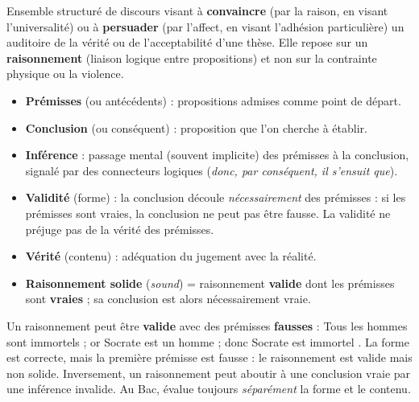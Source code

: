 \documentclass[11pt]{article}
\begin{document}
\begin{definition}[Argumentation]
Ensemble structuré de discours visant à \textbf{convaincre} (par la raison, en visant l'universalité) ou à \textbf{persuader} (par l'affect, en visant l'adhésion particulière) un auditoire de la vérité ou de l'acceptabilité d'une thèse. Elle repose sur un \textbf{raisonnement} (liaison logique entre propositions) et non sur la contrainte physique ou la violence.
\end{definition}

\begin{definition}
\begin{itemize}
  \item \textbf{Prémisses} (ou antécédents) : propositions admises comme point de départ.
  \item \textbf{Conclusion} (ou conséquent) : proposition que l'on cherche à établir.
  \item \textbf{Inférence} : passage mental (souvent implicite) des prémisses à la conclusion, signalé par des connecteurs logiques (\emph{donc, par conséquent, il s'ensuit que}).
\end{itemize}
\end{definition}

\begin{definition}
\begin{itemize}
  \item \textbf{Validité} (forme) : la conclusion découle \emph{nécessairement} des prémisses : si les prémisses sont vraies, la conclusion ne peut pas être fausse. La validité ne préjuge pas de la vérité des prémisses.
  \item \textbf{Vérité} (contenu) : adéquation du jugement avec la réalité.
  \item \textbf{Raisonnement solide} (\emph{sound}) = raisonnement \textbf{valide} dont les prémisses sont \textbf{vraies} ; sa conclusion est alors nécessairement vraie.
\end{itemize}
\end{definition}

\begin{attention}
Un raisonnement peut être \textbf{valide} avec des prémisses \textbf{fausses} : \guillemotleft Tous les hommes sont immortels ; or Socrate est un homme ; donc Socrate est immortel \guillemotright. La forme est correcte, mais la première prémisse est fausse : le raisonnement est valide mais non solide. Inversement, un raisonnement peut aboutir à une conclusion vraie par une inférence invalide. Au Bac, évalue toujours \emph{séparément} la forme et le contenu.
\end{attention}
\end{document}
